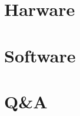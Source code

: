 \documentclass[10pt,ngerman]{beamer}
\begin{document}
\section{Harware}
\begin{frame}

\end{frame}

\begin{frame}

\end{frame}

\section{Software}
\begin{frame}

\end{frame}

\begin{frame}

\end{frame}

\section{Q\&A}
\begin{frame}

\end{frame}
\end{document}
